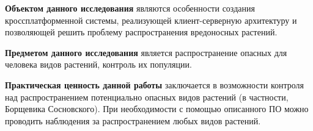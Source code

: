\nwln
\textbf{Объектом данного исследования} являются особенности создания кроссплатформенной системы, реализующей клиент-серверную архитектуру и позволяющей решить проблему распространения вредоносных растений.

\nwln
\textbf{Предметом данного исследования} является распространение опасных для человека видов растений, контроль их популяции.

\nwln
\textbf{Практическая ценность данной работы} заключается в возможности контроля над распространением потенциально опасных видов растений (в частности, Борщевика Сосновского).
При необходимости с помощью описанного ПО можно проводить наблюдения за распространением любых видов растений.
